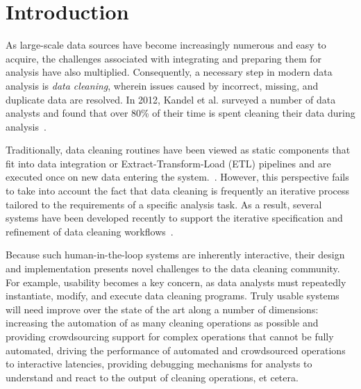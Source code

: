 \section{Introduction}
As large-scale data sources have become increasingly numerous and easy to acquire, the challenges associated with integrating and preparing them for analysis have also multiplied.
Consequently, a necessary step in modern data analysis is \textit{data cleaning}, wherein issues caused by incorrect, missing, and duplicate data are resolved.
In 2012, Kandel et al. surveyed a number of data analysts and found that over 80\% of their time is spent cleaning their data during analysis~\cite{kandel2012}.

Traditionally, data cleaning routines have been viewed as static components that fit into data integration or Extract-Transform-Load (ETL) pipelines and are executed once on new data entering the system.~\cite{apachefalcon, informatica, talend, nadeef}.
However, this perspective fails to take into account the fact that data cleaning is frequently an iterative process tailored to the requirements of a specific analysis task.
As a result, several systems have been developed recently to support the iterative specification and refinement of data cleaning workflows~\cite{trifacta, 2011-wrangler, openrefine, wisteria}.

Because such human-in-the-loop systems are inherently interactive, their design and implementation presents novel challenges to the data cleaning community.
For example, usability becomes a key concern, as data analysts must repeatedly instantiate, modify, and execute data cleaning programs.
Truly usable systems will need improve over the state of the art along a number of dimensions: increasing the automation of as many cleaning operations as possible and providing crowdsourcing support for complex operations that cannot be fully automated, driving the performance of automated and crowdsourced operations to interactive latencies, providing debugging mechanisms for analysts to understand and react to the output of cleaning operations, et cetera.

